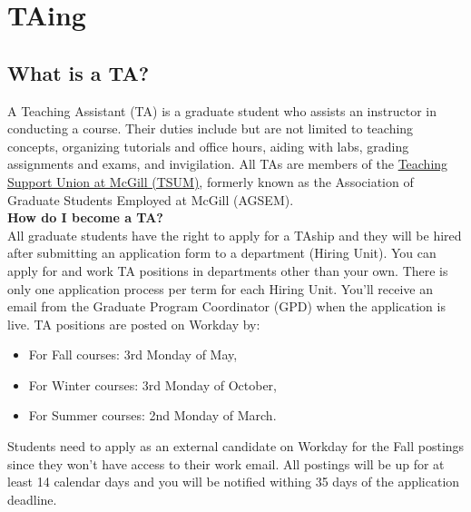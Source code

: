 
\chapter{TAing}

    
\section{What is a TA?}

A Teaching Assistant (TA) is a graduate student who assists an instructor in conducting a course. Their duties include but are not limited to teaching concepts, organizing tutorials and office hours, aiding with labs, grading assignments and exams, and invigilation. All TAs are members of the \href{https://tsum-stsem.ca/}{ Teaching Support Union at McGill (TSUM)}, formerly known as the Association of Graduate Students Employed at McGill (AGSEM). \\


\noindent \textbf{\sffamily How do I become a TA?} \\
All graduate students have the right to apply for a TAship and they will be hired after submitting an application form to a department
(Hiring Unit). You can apply for and work TA positions in departments other than your own. There is only one application process per term for each Hiring Unit. You'll receive an email from the Graduate Program Coordinator (GPD) when the application is live. TA positions are  posted on Workday by: \vspace{5pt}
\begin{itemize}
    \item For Fall courses: 3rd Monday of May,
    \item For Winter courses: 3rd Monday of October,
    \item For Summer courses: 2nd Monday of March.
\end{itemize}

\begin{plaincorollary}
Students need to apply as an external candidate on Workday for the Fall postings since they won't have access to their work email. All postings will be up for at least 14 calendar days and you will be notified withing 35 days of the application deadline. 
\end{plaincorollary}


